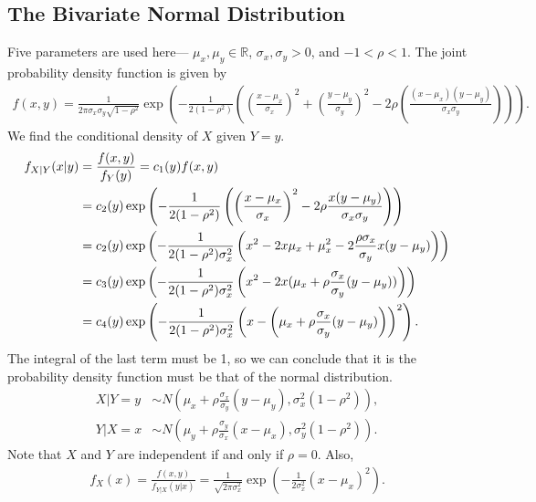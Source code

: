 \documentclass[15pt,a4paper]{book}
\theoremstyle{definition}
\newcommand{\R}{\mathbb{R}}
\begin{document}
\subsection{The Bivariate Normal Distribution}
Five parameters are used here--- $\mu_{x},\mu_{y} \in \R$, $\sigma_{x}, \sigma_{y} > 0$, and $-1 < \rho < 1$. The joint probability density function is given by
\begin{align}
    f(x,y) = \frac{1}{2\pi \sigma_{x}\sigma_{y}\sqrt{1-\rho^{2}}} \exp \left( -\frac{1}{2(1-\rho^{2})} \left( \left( \frac{x-\mu_{x}}{\sigma_{x}} \right)^{2} + \left( \frac{y-\mu_{y}}{\sigma_{y}} \right)^{2} -2\rho \left( \frac{(x-\mu_{x})(y-\mu_{y})}{\sigma_{x} \sigma_{y}} \right) \right) \right).
\end{align}
We find the conditional density of $X$ given $Y = y$.
\begin{align}
    f_{X|Y}(x|y) &= \frac{f(x,y)}{f_{Y}(y)} = c_{1}(y)f(x,y) \\
    &= c_{2}(y) \exp \left( -\frac{1}{2(1-\rho^{2})} \left( \left( \frac{x-\mu_{x}}{\sigma_{x}} \right)^{2} - 2\rho \frac{x(y-\mu_{y})}{\sigma_{x}\sigma_{y}} \right)  \right) \notag\\
    &= c_{2}(y) \exp \left( -\frac{1}{2(1-\rho^{2}) \sigma_{x}^{2}} \left( x^{2}-2x\mu_{x} + \mu_{x}^{2} - 2\frac{\rho \sigma_{x}}{\sigma_{y}} x(y-\mu_{y}) \right)  \right) \notag\\
    &= c_{3}(y) \exp \left( -\frac{1}{2(1-\rho^{2}) \sigma_{x}^{2}} \left( x^{2} -2x (\mu_{x} + \rho \frac{\sigma_{x}}{\sigma_{y}} (y - \mu_{y})) \right)  \right) \notag\\
    &= c_{4}(y) \exp \left( -\frac{1}{2(1-\rho^{2}) \sigma_{x}^{2}} \left( x - \left( \mu_{x} + \rho \frac{\sigma_{x}}{\sigma_{y}} (y - \mu_{y}) \right) \right)^{2}  \right).
\end{align}
The integral of the last term must be 1, so we can conclude that it is the probability density function must be that of the normal distribution.
\begin{align}
    X|Y=y &\sim N\left( \mu_{x} + \rho \frac{\sigma_{x}}{\sigma_{y}}(y-\mu_{y}), \sigma_{x}^{2}(1-\rho^{2}) \right),\\
    Y|X=x &\sim N\left( \mu_{y} + \rho \frac{\sigma_{y}}{\sigma_{x}}(x-\mu_{x}), \sigma_{y}^{2}(1-\rho^{2}) \right).
\end{align}
Note that $X$ and $Y$ are independent if and only if $\rho = 0$. Also,
\begin{align}
    f_{X}(x) = \frac{f(x,y)}{f_{Y|X}(y|x)} = \frac{1}{\sqrt{2\pi \sigma_{x}^{2}}} \exp \left(  -\frac{1}{2\sigma_{x}^{2}} (x-\mu_{x})^{2} \right).
\end{align}
\end{document}

